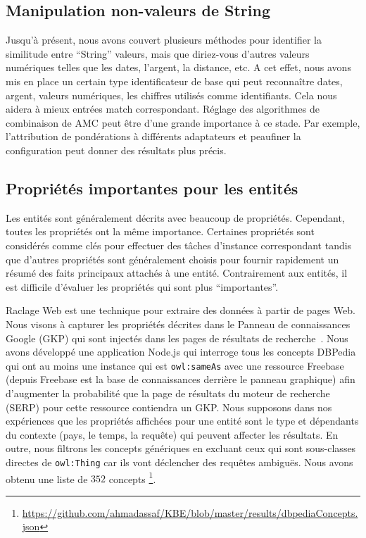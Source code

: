 \documentclass[a4paper,11pt,twoside]{ThesisStyle}
\begin{document}
\subsection{Manipulation non-valeurs de String}

Jusqu'à présent, nous avons couvert plusieurs méthodes pour identifier la similitude entre ``String'' valeurs, mais que diriez-vous d'autres valeurs numériques telles que les dates, l'argent, la distance, etc. A cet effet, nous avons mis en place un certain type identificateur de base qui peut reconnaître dates, argent, valeurs numériques, les chiffres utilisés comme identifiants. Cela nous aidera à mieux entrées match correspondant. Réglage des algorithmes de combinaison de AMC peut être d'une grande importance à ce stade. Par exemple, l'attribution de pondérations à différents adaptateurs et peaufiner la configuration peut donner des résultats plus précis.

\subsection{Propriétés importantes pour les entités}\label{Section:EKG}

Les entités sont généralement décrits avec beaucoup de propriétés. Cependant, toutes les propriétés ont la même importance. Certaines propriétés sont considérés comme clés pour effectuer des tâches d'instance correspondant tandis que d'autres propriétés sont généralement choisis pour fournir rapidement un résumé des faits principaux attachés à une entité. Contrairement aux entités, il est difficile d'évaluer les propriétés qui sont plus ``importantes''.

Raclage Web est une technique pour extraire des données à partir de pages Web. Nous visons à capturer les propriétés décrites dans le Panneau de connaissances Google (GKP) qui sont injectés dans les pages de résultats de recherche~\cite{Bergman: GKG: 12}. Nous avons développé une application Node.js qui interroge tous les concepts DBPedia qui ont au moins une instance qui est \texttt{owl:sameAs} avec une ressource Freebase (depuis Freebase est la base de connaissances derrière le panneau graphique) afin d'augmenter la probabilité que la page de résultats du moteur de recherche (SERP) pour cette ressource contiendra un GKP. Nous supposons dans nos expériences que les propriétés affichées pour une entité sont le type et dépendants du contexte (pays, le temps, la requête) qui peuvent affecter les résultats. En outre, nous filtrons les concepts génériques en excluant ceux qui sont sous-classes directes de \texttt{owl:Thing} car ils vont déclencher des requêtes ambiguës. Nous avons obtenu une liste de $352$ concepts \footnote{\url{https://github.com/ahmadassaf/KBE/blob/master/results/dbpediaConcepts.json}}.
\end{document}
